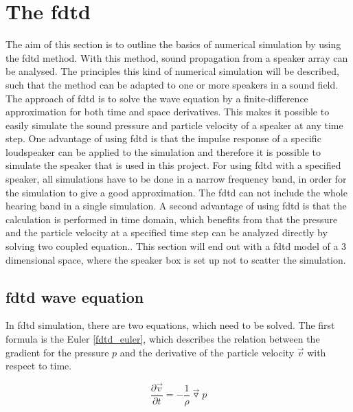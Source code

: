 \section{The \gls{fdtd}}\label{sec:fdtd}
The aim of this section is to outline the basics of numerical simulation by using the \gls{fdtd} method. With this method, sound propagation from a speaker array can be analysed. The principles this kind of numerical simulation will be described, such that the method can be adapted to one or more speakers in a sound field. 
The approach of \gls{fdtd} is to solve the wave equation by a finite-difference approximation for both time and space derivatives. This makes it possible to easily simulate the sound pressure and particle velocity of a speaker at any time step. One advantage of using \gls{fdtd} is that the impulse response of a specific loudspeaker can be applied to the simulation and therefore it is possible to simulate the speaker that is used in this project. For using \gls{fdtd} with a specified speaker, all simulations have to be done in a narrow frequency band, in order for the simulation to give a good approximation. The \gls{fdtd} can not include the whole hearing band in a single simulation. A second advantage of using \gls{fdtd} is that the calculation is performed in time domain, which benefits from that the pressure and the particle velocity at a specified time step can be analyzed directly by solving two coupled equation.\citep{fdtddaga}. This section will end out with a \gls{fdtd} model of a 3 dimensional space, where the speaker box is set up not to scatter the simulation.\\

\subsection{\gls{fdtd} wave equation}
In \gls{fdtd} simulation, there are two equations, which need to be solved. The first formula is the Euler \autoref{fdtd_euler}, which describes the relation between the gradient for the pressure $p$ and the derivative of the particle velocity $\vec{v}$ with respect to time. 

\begin{equation}\label{fdtd_euler}
\frac{\partial \vec{v}}{\partial t} =- \frac{1}{\rho}\vec{\triangledown }p
\end{equation}

    \startexplain
    \stopexplain

